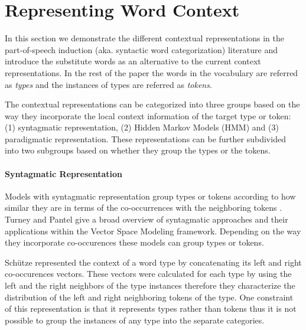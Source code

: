 \section{Representing Word Context}
\label{sec:representation}


In this section we demonstrate the different contextual
representations in the part-of-speech induction (aka. syntactic word
categorization) literature and introduce the substitute words as an
alternative to the current context representations.  In the rest of
the paper the words in the vocabulary are referred as {\em types} and
the instances of types are referred as {\em tokens}.

The contextual representations can be categorized into three groups
based on the way they incorporate the local context information of the
target type or token: (1) syntagmatic representation, (2) Hidden
Markov Models (HMM) and (3) paradigmatic representation.  These
representations can be further subdivided into two subgroups based on
whether they group the types or the tokens.

\paragraph{Syntagmatic Representation} Models with syntagmatic representation
group types or tokens according to how similar they are in terms of
the co-occurrences with the neighboring tokens
\cite{SchutzePe93,mintz2003frequent,20674613,lamar-EtAl:2010:Short,maron2010sphere}.
Turney and Pantel  give a
broad overview of syntagmatic approaches and their applications within
the Vector Space Modeling framework.  Depending on the way they
incorporate co-occurences these models can group types or tokens.

Sch\"{u}tze  represented the context of a word
type by concatenating its left and right co-occurences vectors.  These
vectors were calculated for each type by using the left and the right
neighbors of the type instances therefore they characterize the
distribution of the left and right neighboring tokens of the type.
One constraint of this representation is that it represents types
rather than tokens thus it is not possible to group the instances of
any type into the separate categories.


